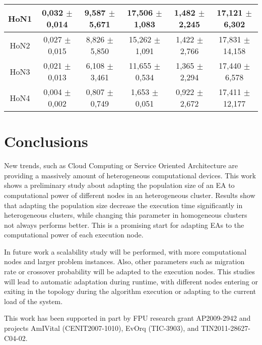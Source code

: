 \begin{table*}
\begin{tabular}{|c|c|c|c|c|c|}
HoN1	& 0,032	$\pm$ 0,014	& 9,587 $\pm$ 	5,671		& 17,506	$\pm$ 1,083		& 1,482	$\pm$ 2,245	&17,121  $\pm$ 	6,302 \\ \hline
HoN2	& 0,027	$\pm$ 0,015	& 8,826	$\pm$ 5,850			& 15,262	$\pm$ 1,091		& 1,422	$\pm$ 2,766	&17,831	 $\pm$ 14,158 \\ \hline
HoN3	& 0,021	$\pm$ 0,013	& 6,108	$\pm$ 3,461			& 11,655	$\pm$ 0,534		& 1,365	$\pm$ 2,294  &17,440  $\pm$ 	6,578 \\ \hline
HoN4	& 0,004	$\pm$ 0,002	& 0,807	$\pm$ 0,749			& 1,653		$\pm$ 0,051		& 0,922	$\pm$ 2,672	&17,411	 $\pm$ 12,177 \\ \hline
\end{tabular}
\label{tab:onemaxtimes}
\end{table*}

\section{Conclusions}
New trends, such as Cloud Computing or Service Oriented Architecture are providing a massively amount of heterogeneous computational devices. This work shows a preliminary study about adapting the population size of an EA to computational power of different nodes in an heterogeneous cluster. Results show that adapting the population size decrease the execution time significantly in heterogeneous clusters, while changing this parameter in homogeneous clusters not always performs better. This is a promising start for adapting EAs to the computational power of each execution node.

In future work a scalability study will be performed, with more computational nodes and larger problem instances. Also, other parameters such as migration rate or crossover probability will be adapted to the execution nodes. This studies will lead to automatic adaptation during runtime, with different nodes entering or exiting in the topology during the algorithm execution or adapting to the current load of the system.



\begin{acknowledgements}
This work has been supported in part by FPU research grant AP2009-2942 and projects AmIVital (CENIT2007-1010), EvOrq (TIC-3903), and TIN2011-28627-C04-02.
\end{acknowledgements}


 






